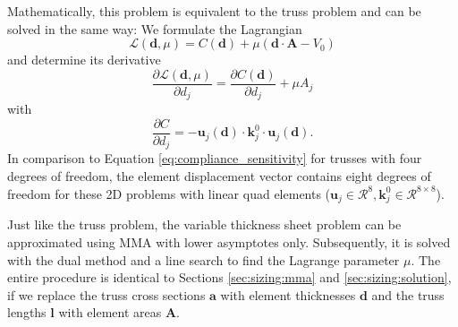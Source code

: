 Mathematically, this problem is equivalent to the truss problem and can be solved in the same way: We formulate the Lagrangian
\begin{equation}
    \mathcal{L}(\mathbf{d}, \mu) = C(\mathbf{d}) + \mu \left( \mathbf{d} \cdot \mathbf{A} - V_0 \right) 
\end{equation}
and determine its derivative
\begin{equation}
    \frac{\partial \mathcal{L} (\mathbf{d}, \mu)}{\partial d_j} 
    = \frac{\partial C(\mathbf{d})}{\partial d_j} + \mu A_j 
\end{equation}
with 
\begin{equation}
    \frac{\partial C}{\partial d_j} = - \mathbf{u}_j(\mathbf{d})  \cdot \mathbf{k}^0_j \cdot \mathbf{u}_j(\mathbf{d}).
    \label{eq:sensitivity_sheet}
\end{equation}
In comparison to Equation \eqref{eq:compliance_sensitivity} for trusses with four degrees of freedom, the element displacement vector contains eight degrees of freedom for these 2D problems with linear quad elements ($\mathbf{u}_j \in \mathcal{R}^8, \mathbf{k}^0_j \in \mathcal{R}^{8\times 8}$). 

Just like the truss problem, the variable thickness sheet problem can be approximated using MMA with lower asymptotes only. Subsequently, it is solved with the dual method and a line search to find the Lagrange parameter $\mu$. The entire procedure is identical to Sections \ref{sec:sizing:mma} and \ref{sec:sizing:solution}, if we replace the truss cross sections $\mathbf{a}$ with element thicknesses $\mathbf{d}$ and the truss lengths $\mathbf{l}$ with element areas $\mathbf{A}$.

